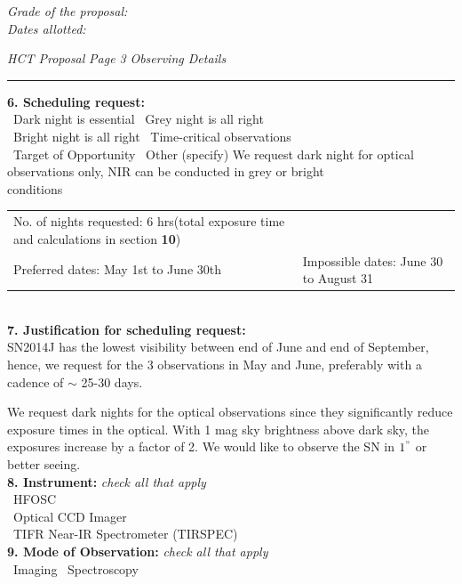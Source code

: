 \documentclass[11pt]{article}
\begin{document}
{\it Grade of the proposal:} \hfil \\

{\it Dates allotted:}

\newpage
{\it HCT Proposal}\hskip 5cm {\it Page 3} \hfill {\it Observing Details}\\[1mm]
\hrule
{\bf 6. Scheduling request: }~~~~~\\
%

\YES~Dark night is essential \hfil \NO~Grey night is all right~~~~~\\
\NO~Bright night is all right \hfil \YES~Time-critical observations\\
\NO~Target of Opportunity \hfil \YES~Other (specify)  We request dark night for optical observations only, NIR can be conducted in grey or bright conditions~~~~~~~~~~~~~\\

\begin{tabular}[t]{p{9cm}p{9cm}}
{No. of nights requested: 6 hrs}(total exposure time and calculations in section \textbf{10})\\
{Preferred dates: May 1st to June 30th} & {Impossible dates: June 30 to August 31}\\

\end{tabular} \\ 

{\bf 7. Justification for scheduling request: }\\
SN2014J has the lowest visibility between end of June and end of September, hence, we request for the 3 observations in May and June, preferably with a cadence of $\sim$ 25-30 days. 

We request dark nights for the optical observations since they significantly reduce exposure times in the optical. With 1 mag  sky brightness above dark sky, the exposures increase by a factor of 2. We would like to observe the SN in $1^{"}$ or better seeing. 
\\

{\bf 8. Instrument:} {\sl check all that apply}\\
%
\YES~HFOSC\\
\NO~Optical CCD Imager\\
\YES~TIFR Near-IR Spectrometer (TIRSPEC)\\

{\bf 9. Mode of Observation:} {\sl check all that apply}\\ 
%
\YES~Imaging
\NO~Spectroscopy
\\
\end{document}
